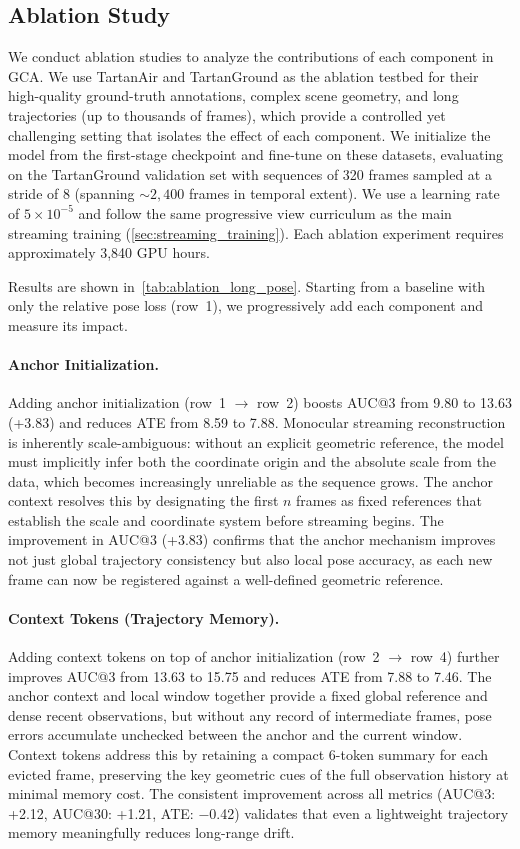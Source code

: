 \subsection{Ablation Study}
We conduct ablation studies to analyze the contributions of each
component in GCA.
We use TartanAir and TartanGround as the ablation testbed for their
high-quality ground-truth annotations, complex scene geometry, and
long trajectories (up to thousands of frames), which provide a
controlled yet challenging setting that isolates the effect of each
component.
We initialize the model from the first-stage checkpoint and fine-tune
on these datasets, evaluating on the TartanGround validation set
with sequences of 320 frames sampled at a stride of 8 (spanning
${\sim}2{,}400$ frames in temporal extent).
We use a learning rate of $5 \times 10^{-5}$ and follow the same
progressive view curriculum as the main streaming training
(\cref{sec:streaming_training}).
Each ablation experiment requires approximately 3,840 GPU hours.

Results are shown in~\cref{tab:ablation_long_pose}. Starting
from a baseline with only the relative pose loss (row~1), we
progressively add each component and measure its impact.

\paragraph{Anchor Initialization.}
Adding anchor initialization (row~1 $\to$ row~2) boosts AUC@3 from
9.80 to 13.63 (+3.83) and reduces ATE from 8.59 to 7.88.
Monocular streaming reconstruction is inherently scale-ambiguous:
without an explicit geometric reference, the model must implicitly
infer both the coordinate origin and the absolute scale from the
data, which becomes increasingly unreliable as the sequence grows.
The anchor context resolves this by designating the first $n$ frames
as fixed references that establish the scale and coordinate system
before streaming begins.
The improvement in AUC@3 (+3.83) confirms that the anchor mechanism
improves not just global trajectory consistency but also local pose
accuracy, as each new frame can now be registered against a
well-defined geometric reference.

\paragraph{Context Tokens (Trajectory Memory).}
Adding context tokens on top of anchor initialization (row~2 $\to$
row~4) further improves AUC@3 from 13.63 to 15.75 and reduces ATE
from 7.88 to 7.46.
The anchor context and local window together provide a fixed global
reference and dense recent observations, but without any record of
intermediate frames, pose errors accumulate unchecked between the
anchor and the current window.
Context tokens address this by retaining a compact 6-token summary
for each evicted frame, preserving the key geometric cues of the
full observation history at minimal memory cost.
The consistent improvement across all metrics (AUC@3: +2.12,
AUC@30: +1.21, ATE: $-$0.42) validates that even a lightweight
trajectory memory meaningfully reduces long-range drift.


